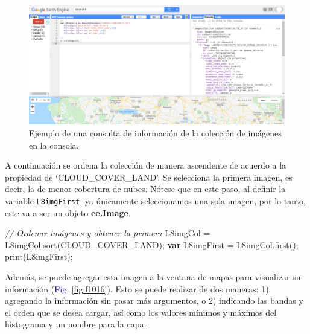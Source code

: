 \documentclass[
  12pt,
  letterpaper,
  twoside]{book}
\newenvironment{Shaded}{\begin{snugshade}}{\end{snugshade}}
\newcommand{\CommentTok}[1]{\textcolor[rgb]{0.24,0.58,0.00}{\textit{#1}}}
\newcommand{\FunctionTok}[1]{\textcolor[rgb]{0.48,0.12,0.64}{#1}}
\newcommand{\KeywordTok}[1]{\textcolor[rgb]{0.00,0.00,0.00}{\textbf{#1}}}
\newcommand{\NormalTok}[1]{#1}
\newcommand{\OperatorTok}[1]{\textcolor[rgb]{0.00,0.00,0.00}{#1}}
\newcommand{\StringTok}[1]{\textcolor[rgb]{0.87,0.29,0.22}{#1}}
\newcommand\boldpurple[1]{\textcolor{darkpurple}{\textbf{#1}}}
\begin{document}
\begin{figure}[H]

{\centering \includegraphics[width=0.95\linewidth]{Img/CamposImgCol} 

}

\caption{Ejemplo de una consulta de información de la colección de imágenes en la consola.}\label{fig:f1015}
\end{figure}

A continuación se ordena la colección de manera ascendente de acuerdo a la propiedad de `CLOUD\_COVER\_LAND'. Se selecciona la primera imagen, es decir, la de menor cobertura de nubes. Nótese que en este paso, al definir la variable \texttt{L8imgFirst}, ya únicamente seleccionamos una sola imagen, por lo tanto, este va a ser un objeto \boldpurple{ee.Image}.

\begin{Shaded}
\begin{Highlighting}[]
\CommentTok{// Ordenar imágenes y obtener la primera}
\NormalTok{L8imgCol }\OperatorTok{=}\NormalTok{ L8imgCol}\OperatorTok{.}\FunctionTok{sort}\NormalTok{(}\StringTok{\textquotesingle{}CLOUD\_COVER\_LAND\textquotesingle{}}\NormalTok{)}\OperatorTok{;}
\KeywordTok{var}\NormalTok{ L8imgFirst }\OperatorTok{=}\NormalTok{ L8imgCol}\OperatorTok{.}\FunctionTok{first}\NormalTok{()}\OperatorTok{;} 
\FunctionTok{print}\NormalTok{(L8imgFirst)}\OperatorTok{;}
\end{Highlighting}
\end{Shaded}

Además, se puede agregar esta imagen a la ventana de mapas para visualizar su información (\textcolor{darkblue}{Fig.} \ref{fig:f1016}). Esto se puede realizar de dos maneras: 1) agregando la información sin pasar más argumentos, o 2) indicando las bandas y el orden que se desea cargar, así como los valores mínimos y máximos del histograma y un nombre para la capa.
\end{document}
